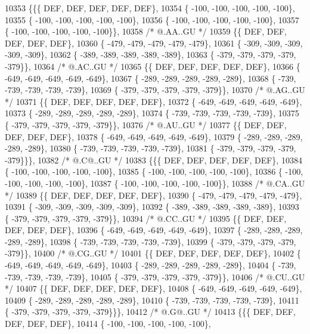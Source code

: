 \begin{DoxyCode}
10353 \{\{\{  DEF,  DEF,  DEF,  DEF,  DEF\},
10354 \{ -100, -100, -100, -100, -100\},
10355 \{ -100, -100, -100, -100, -100\},
10356 \{ -100, -100, -100, -100, -100\},
10357 \{ -100, -100, -100, -100, -100\}\},
10358 \textcolor{comment}{/*  @.AA..GU */}
10359 \{\{  DEF,  DEF,  DEF,  DEF,  DEF\},
10360 \{ -479, -479, -479, -479, -479\},
10361 \{ -309, -309, -309, -309, -309\},
10362 \{ -389, -389, -389, -389, -389\},
10363 \{ -379, -379, -379, -379, -379\}\},
10364 \textcolor{comment}{/*  @.AC..GU */}
10365 \{\{  DEF,  DEF,  DEF,  DEF,  DEF\},
10366 \{ -649, -649, -649, -649, -649\},
10367 \{ -289, -289, -289, -289, -289\},
10368 \{ -739, -739, -739, -739, -739\},
10369 \{ -379, -379, -379, -379, -379\}\},
10370 \textcolor{comment}{/*  @.AG..GU */}
10371 \{\{  DEF,  DEF,  DEF,  DEF,  DEF\},
10372 \{ -649, -649, -649, -649, -649\},
10373 \{ -289, -289, -289, -289, -289\},
10374 \{ -739, -739, -739, -739, -739\},
10375 \{ -379, -379, -379, -379, -379\}\},
10376 \textcolor{comment}{/*  @.AU..GU */}
10377 \{\{  DEF,  DEF,  DEF,  DEF,  DEF\},
10378 \{ -649, -649, -649, -649, -649\},
10379 \{ -289, -289, -289, -289, -289\},
10380 \{ -739, -739, -739, -739, -739\},
10381 \{ -379, -379, -379, -379, -379\}\}\},
10382 \textcolor{comment}{/*  @.C@..GU */}
10383 \{\{\{  DEF,  DEF,  DEF,  DEF,  DEF\},
10384 \{ -100, -100, -100, -100, -100\},
10385 \{ -100, -100, -100, -100, -100\},
10386 \{ -100, -100, -100, -100, -100\},
10387 \{ -100, -100, -100, -100, -100\}\},
10388 \textcolor{comment}{/*  @.CA..GU */}
10389 \{\{  DEF,  DEF,  DEF,  DEF,  DEF\},
10390 \{ -479, -479, -479, -479, -479\},
10391 \{ -309, -309, -309, -309, -309\},
10392 \{ -389, -389, -389, -389, -389\},
10393 \{ -379, -379, -379, -379, -379\}\},
10394 \textcolor{comment}{/*  @.CC..GU */}
10395 \{\{  DEF,  DEF,  DEF,  DEF,  DEF\},
10396 \{ -649, -649, -649, -649, -649\},
10397 \{ -289, -289, -289, -289, -289\},
10398 \{ -739, -739, -739, -739, -739\},
10399 \{ -379, -379, -379, -379, -379\}\},
10400 \textcolor{comment}{/*  @.CG..GU */}
10401 \{\{  DEF,  DEF,  DEF,  DEF,  DEF\},
10402 \{ -649, -649, -649, -649, -649\},
10403 \{ -289, -289, -289, -289, -289\},
10404 \{ -739, -739, -739, -739, -739\},
10405 \{ -379, -379, -379, -379, -379\}\},
10406 \textcolor{comment}{/*  @.CU..GU */}
10407 \{\{  DEF,  DEF,  DEF,  DEF,  DEF\},
10408 \{ -649, -649, -649, -649, -649\},
10409 \{ -289, -289, -289, -289, -289\},
10410 \{ -739, -739, -739, -739, -739\},
10411 \{ -379, -379, -379, -379, -379\}\}\},
10412 \textcolor{comment}{/*  @.G@..GU */}
10413 \{\{\{  DEF,  DEF,  DEF,  DEF,  DEF\},
10414 \{ -100, -100, -100, -100, -100\},

\end{DoxyCode}

